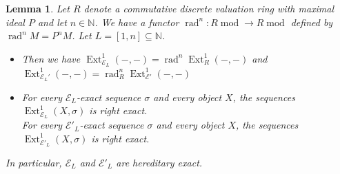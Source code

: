 \documentclass[11pt,a4paper]{amsart}
\theoremstyle{plain}
\newtheorem{lem}[thm]{Lemma}
\theoremstyle{definition}
\DeclareMathOperator{\Ext}{Ext}
\DeclareMathOperator{\modu}{mod}
\newcommand{\mcE}{\mathcal{E}}
\DeclareMathOperator{\rad}{rad}
\begin{document}
\begin{lem} \label{radExt} Let $R$ denote a commutative discrete valuation ring   with maximal ideal $P$ and let $n \in\mathbb{N}$.  
We have a functor $\rad^n \colon R\modu \to R\modu$ defined by $\rad^n M = P^n M$. Let $L=[1,n]\subseteq \mathbb{N}$. 
\begin{itemize}
\item[(1)] Then we have $\Ext^1_{\mcE_L} (-,-)=\rad^n\Ext^1_R(-,-)$ and $\Ext^1_{\mcE_L'} (-,-)=\rad^n_R\Ext^1_{\mcE'}(-,-)$
\item[(2)] For every $\mcE_L$-exact sequence $\sigma$ and every object $X$, the sequences $\Ext^1_{\mcE_L} (X,\sigma)$ is right exact.\\
\noindent
For every $\mcE'_L$-exact sequence $\sigma$ and every object $X$, the sequences $\Ext^1_{\mcE'_L} (X,\sigma)$ is right exact.
\end{itemize}    
In particular, $\mcE_L$ and $\mcE'_L$ are hereditary exact. 
\end{lem}
\end{document}
